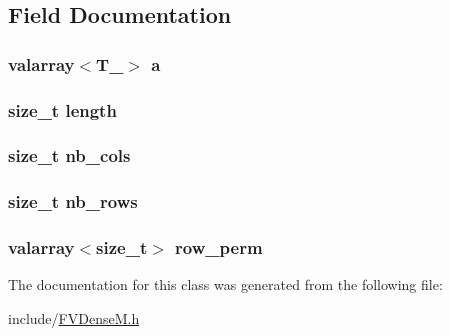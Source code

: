 \subsection{Field Documentation}
\hypertarget{classFVDenseM_a79134a5b7e0d6acf861da02da21d735e}{
\subsubsection[{a}]{\setlength{\rightskip}{0pt plus 5cm}valarray$<$T\_\-$>$ {\bf a}}}
\label{d9/d70/classFVDenseM_a79134a5b7e0d6acf861da02da21d735e}
\hypertarget{classFVDenseM_ae809d5359ac030c60a30a8f0b2294b82}{
\subsubsection[{length}]{\setlength{\rightskip}{0pt plus 5cm}size\_\-t {\bf length}}}
\label{d9/d70/classFVDenseM_ae809d5359ac030c60a30a8f0b2294b82}
\hypertarget{classFVDenseM_a4451904bc3a87b7e94ba9967cfe5acc9}{
\subsubsection[{nb\_\-cols}]{\setlength{\rightskip}{0pt plus 5cm}size\_\-t {\bf nb\_\-cols}}}
\label{d9/d70/classFVDenseM_a4451904bc3a87b7e94ba9967cfe5acc9}
\hypertarget{classFVDenseM_a660778a5412448cf6b641e67d1d70011}{
\subsubsection[{nb\_\-rows}]{\setlength{\rightskip}{0pt plus 5cm}size\_\-t {\bf nb\_\-rows}}}
\label{d9/d70/classFVDenseM_a660778a5412448cf6b641e67d1d70011}
\hypertarget{classFVDenseM_a8c10fbbfbdfafbb79c6856b23415ec4f}{
\subsubsection[{row\_\-perm}]{\setlength{\rightskip}{0pt plus 5cm}valarray$<$size\_\-t$>$ {\bf row\_\-perm}}}
\label{d9/d70/classFVDenseM_a8c10fbbfbdfafbb79c6856b23415ec4f}


The documentation for this class was generated from the following file:\begin{DoxyCompactItemize}
\item 
include/\hyperlink{FVDenseM_8h}{FVDenseM.h}\end{DoxyCompactItemize}
